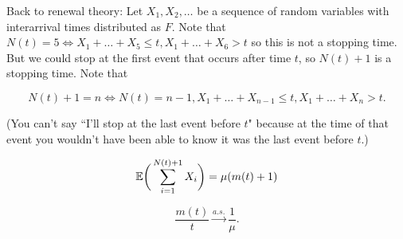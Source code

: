 Back to renewal theory: Let \(X_1, X_2, \ldots\) be a sequence of random variables with interarrival times distributed as \(F\). Note that \(N(t) = 5 \iff X_1 + \ldots + X_5 \leq t, X_1 + \ldots + X_6 > t\) so this is not a stopping time. But we could stop at the first event that occurs after time \(t\), so \(N(t)+1\) is a stopping time. Note that 

\[
N(t) + 1 = n \iff N(t) = n - 1, X_1 + \ldots + X_{n-1} \leq t, X_1 + \ldots + X_n > t.
\]

(You can't say ``I'll stop at the last event before \(t\)" because at the time of that event you wouldn't have been able to know it was the last event before \(t\).)

\begin{corollary}\label{stoch.wald.eqn.cor}

\[
\E \bigg( \sum_{i=1}^{N(t) + 1} X_i \bigg) = \mu(m(t) +1)
\]

\end{corollary}

\begin{theorem} 

\[
\frac{m(t)}{t} \xrightarrow{a.s.} \frac{1}{\mu}.
\]

\end{theorem}

